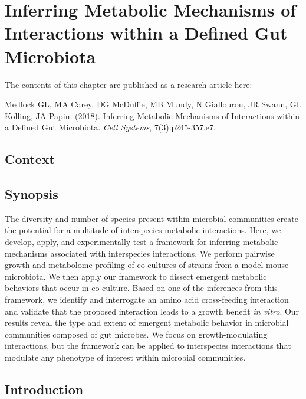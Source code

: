 \documentclass[11pt,twocolumn,notitlepage,openany,twoside]{book}
\begin{document}
\chapter{Inferring Metabolic Mechanisms of Interactions within a Defined Gut Microbiota}

\begin{refsection}

The contents of this chapter are published as a research article here:

\medskip\noindent
Medlock GL, MA Carey, DG McDuffie, MB Mundy, N Giallourou, JR Swann, GL Kolling, JA Papin. (2018). Inferring Metabolic Mechanisms of Interactions within a Defined Gut Microbiota. \textit{Cell Systems}, 7(3):p245-357.e7.

\section{Context}

\section{Synopsis}

The diversity and number of species present within microbial communities create the potential for a multitude of interspecies metabolic interactions. Here, we develop, apply, and experimentally test a framework for inferring metabolic mechanisms associated with interspecies interactions. We perform pairwise growth and metabolome profiling of co-cultures of strains from a model mouse microbiota. We then apply our framework to dissect emergent metabolic behaviors that occur in co-culture. Based on one of the inferences from this framework, we identify and interrogate an amino acid cross-feeding interaction and validate that the proposed interaction leads to a growth benefit \textit{in vitro}. Our results reveal the type and extent of emergent metabolic behavior in microbial communities composed of gut microbes. We focus on growth-modulating interactions, but the framework can be applied to interspecies interactions that modulate any phenotype of interest within microbial communities.

\section{Introduction}


\end{refsection}
\end{document}
